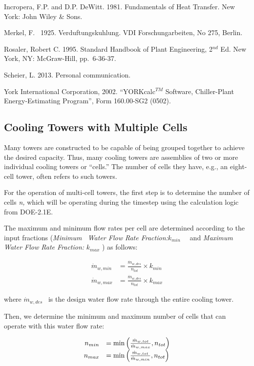 Incropera, F.P. and D.P. DeWitt. 1981. Fundamentals of Heat Transfer. New York: John Wiley \& Sons.

Merkel, F.~ 1925. Verduftungskuhlung. VDI Forschungarbeiten, No 275, Berlin.

Rosaler, Robert C. 1995. Standard Handbook of Plant Engineering, 2\(^{nd}\) Ed. New York, NY: McGraw-Hill, pp.~6-36-37.

Scheier, L. 2013. Personal communication.

York International Corporation, 2002. ``YORKcalc\(^{TM}\) Software, Chiller-Plant Energy-Estimating Program'', Form 160.00-SG2 (0502).

\subsection{Cooling Towers with Multiple Cells}\label{cooling-towers-with-multiple-cells}

Many towers are constructed to be capable of being grouped together to achieve the desired capacity. Thus, many cooling towers are assemblies of two or more individual cooling towers or ``cells.'' The number of cells they have, e.g., an eight-cell tower, often refers to such towers.

For the operation of multi-cell towers, the first step is to determine the number of cells \emph{n,} which will be operating during the timestep using the calculation logic from DOE-2.1E.

The maximum and minimum flow rates per cell are determined according to the input fractions (\emph{Minimum~ Water Flow Rate Fraction:}\({k_{min}}\) \emph{~}~and \emph{Maximum~ Water Flow Rate Fraction:} \({k_{max}}\) ) as follows:

\begin{equation}
    \begin{array}{rl}
      \dot{m}_{w,min} &= \frac{\dot{m}_{w,des}}{n_{tot}} \times k_{min} \\
      \dot{m}_{w,max} &= \frac{\dot{m}_{w,des}}{n_{tot}} \times k_{max}
    \end{array}
\end{equation}

where \({{{\dot m}_{w,des}}}\) ~is the design water flow rate through the entire cooling tower.

Then, we determine the minimum and maximum number of cells that can operate with this water flow rate:

\begin{equation}
    \begin{array}{rl}
      n_{min} & = \min\left(\frac{\dot{m}_{w,tot}}{\dot{m}_{w,max}},n_{tot}\right) \\
      n_{max} & = \min\left(\frac{\dot{m}_{w,tot}}{\dot{m}_{w,min}},n_{tot}\right)
    \end{array}
\end{equation}

